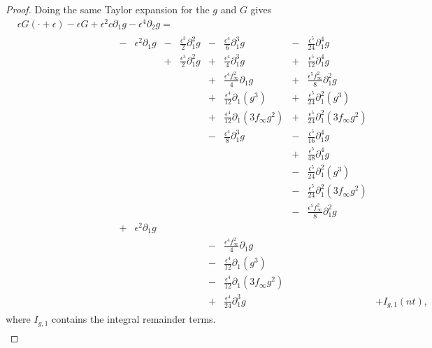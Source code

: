 \begin{proof}
	Doing the same Taylor expansion for the \(g\) and \(G\) gives
	\begin{equation}
		\begin{aligned}
			&\epsilon G(\cdot + \epsilon) - \epsilon G + \epsilon^2c \partial_1 g - \epsilon^4 \partial_2 g  = \\
			&\hspace{10em}\begin{aligned}
				- & \epsilon^2 \partial_1 g & -&\frac{\epsilon^3} 2 \partial_1^2 g & - &\frac{\epsilon^4} 6 \partial_1^3 g & - & \frac{\epsilon^5}{24} \partial_1^4 g \\
				& & +&\frac{\epsilon^3} 2 \partial_1^2 g & + &\frac{\epsilon^4} 4\partial_1^3 g &+ & \frac{\epsilon^5}{12} \partial_1^4 g \\
				& & & & + &\frac{\epsilon^4 f_\infty^2} 4\partial_1 g & + & \frac{\epsilon^5f_\infty^2} 8 \partial_1^2 g  \\
				& & & & + &\frac{\epsilon^4} {12}\partial_1 (g^3) & + & \frac{\epsilon^5}{24} \partial_1^2(g^3) \\
				& & & & + &\frac{\epsilon^4} {12}\partial_1 (3f_\infty g^2) & + & \frac{\epsilon^5}{24}\partial_1^2(3f_\infty g^2)  \\
				& & & & - &\frac{\epsilon^4} {8}\partial_1^3 g & - &  \frac{\epsilon^5}{16} \partial_1^4 g  \\ 
				& & & & & & + & \frac{\epsilon^5}{48} \partial_1^4 g  \\
				& & & & & & - & \frac{\epsilon^5}{24} \partial_1^2(g^3) \\
				& & & & & & - & \frac{\epsilon^5}{24} \partial_1^2(3f_\infty g^2) \\
				& & & & & & - & \frac{\epsilon^5 f_\infty ^2} 8 \partial_1^2 g  \\
				+&\epsilon^2 \partial_1g \\
				& & & & - & \frac{\epsilon^4f_\infty ^2}{4} \partial_1 g \\
				& & & & - &\frac{\epsilon^4} {12}\partial_1 (g^3) \\
				& & & & - &\frac{\epsilon^4} {12}\partial_1 (3f_\infty g^2) \\ 
				& & & & + & \frac{\epsilon^4}{24} \partial_1^3 g && &+ I_{g,1}(nt),
			\end{aligned}
		\end{aligned}
	\end{equation}
	where \(I_{g,1}\) contains the integral remainder terms.
	\begin{equation}\label{Ig1}
	\begin{aligned}

\end{aligned}
\end{equation}
\end{proof}

